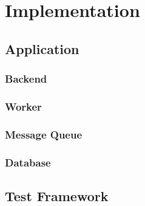 \chapter{Implementation}

\section{Application}

\subsection{Backend}

\subsection{Worker}

\subsection{Message Queue}

\subsection{Database}



\section{Test Framework}

